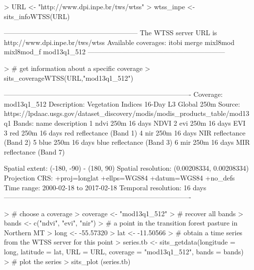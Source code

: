 \documentclass[article]{jss}
\begin{document}
\begin{CodeChunk}

\begin{CodeInput}
> URL <- "http://www.dpi.inpe.br/tws/wtss"
> wtss_inpe <- sits_infoWTSS(URL)
\end{CodeInput}

\begin{CodeOutput}
-----------------------------------------------------------
The WTSS server URL is http://www.dpi.inpe.br/tws/wtss
Available coverages: 
itobi
merge
mixl8mod
mixl8mod_f
mod13q1_512
------------------------------------------------------------
\end{CodeOutput}
\end{CodeChunk}

\begin{CodeChunk}

\begin{CodeInput}
> # get information about a specific coverage
> sits_coverageWTSS(URL,"mod13q1_512")
\end{CodeInput}

\begin{CodeOutput}
----------------------------------------------------------------------------------
Coverage: mod13q1_512
Description: Vegetation Indices 16-Day L3 Global 250m
Source: https://lpdaac.usgs.gov/dataset_discovery/modis/modis_products_table/mod13q1
Bands: 
  name                            description
1 ndvi                      250m 16 days NDVI
2  evi                       250m 16 days EVI
3  red  250m 16 days red reflectance (Band 1)
4  nir  250m 16 days NIR reflectance (Band 2)
5 blue 250m 16 days blue reflectance (Band 3)
6  mir  250m 16 days MIR reflectance (Band 7)

Spatial extent: (-180, -90) - (180, 90)
Spatial resolution: (0.00208334, 0.00208334)
Projection CRS: +proj=longlat +ellps=WGS84 +datum=WGS84 +no_defs
Time range: 2000-02-18 to 2017-02-18
Temporal resolution: 16 days 
----------------------------------------------------------------------------------
\end{CodeOutput}

\begin{CodeInput}
> # choose a coverage
> coverage <- "mod13q1_512"
> # recover all bands
> bands <- c("ndvi", "evi", "nir")
> # a point in the transition forest pasture in Northern MT
> long <- -55.57320
> lat <- -11.50566
> # obtain a time series from the WTSS server for this point
> series.tb <- sits_getdata(longitude = long, latitude = lat, URL = URL, coverage = "mod13q1_512", bands = bands)
> # plot the series
> sits_plot (series.tb)
\end{CodeInput}



\end{CodeChunk}
\end{document}
